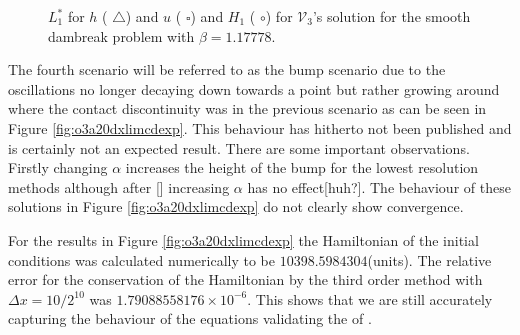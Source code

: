 \documentclass[SingleSpace,12pt,Journal]{Serre_ASCE}
\begin{document}
\begin{figure}
\centering
{}
\caption{$L^*_1$ for $h$ ({\color{red} $\triangle$}) and $u$ ({\color{blue} $\square$}) and $H_1$ ({\color{blue} $\circ$}) for $\mathcal{V}_3$'s solution for the smooth dambreak problem with $\beta = 1.17778$.}
\label{fig:o3a3dxlimmeasure}
\end{figure}

The fourth scenario will be referred to as the bump scenario due to the oscillations no longer decaying down towards a point but rather growing around where the contact discontinuity was in the previous scenario as can be seen in Figure \ref{fig:o3a20dxlimcdexp}. This behaviour has hitherto not been published and is certainly not an expected result. There are some important observations. Firstly changing $\alpha$ increases the height of the bump for the lowest resolution methods although after [] increasing $\alpha$ has no effect[huh?]. The behaviour of these solutions in Figure \ref{fig:o3a20dxlimcdexp} do not clearly show convergence.

For the results in Figure \ref{fig:o3a20dxlimcdexp} the Hamiltonian of the initial conditions was calculated numerically to be $10398.5984304$(units). The relative error for the conservation of the Hamiltonian by the third order method with $\Delta x = 10/2^{10}$ was $1.79088558176 \times 10^{-6}$. This shows that we are still accurately capturing the behaviour of the equations validating the of .
\end{document}
